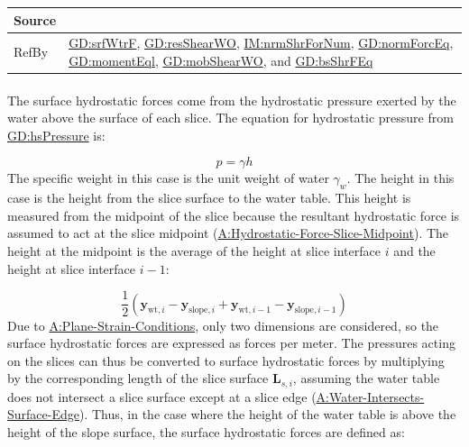 \documentclass[12pt]{article}
\begin{document}
\begin{minipage}{\textwidth}
\begin{tabular}{>{\raggedright}p{}>{\raggedright\arraybackslash}p{}}
\\ \midrule
Source & \cite{fredlund1977}
         
\\ \midrule
RefBy & \hyperref[GD:srfWtrF]{GD:srfWtrF}, \hyperref[GD:resShearWO]{GD:resShearWO}, \hyperref[IM:nrmShrForNum]{IM:nrmShrForNum}, \hyperref[GD:normForcEq]{GD:normForcEq}, \hyperref[GD:momentEql]{GD:momentEql}, \hyperref[GD:mobShearWO]{GD:mobShearWO}, and \hyperref[GD:bsShrFEq]{GD:bsShrFEq}
        
\\ \bottomrule
\end{tabular}
\end{minipage}

\paragraph{}
\label{GD:srfWtrFDeriv}
The surface hydrostatic forces come from the hydrostatic pressure exerted by the water above the surface of each slice. The equation for hydrostatic pressure from \hyperref[GD:hsPressure]{GD:hsPressure} is:

\begin{displaymath}
p=γ h
\end{displaymath}
The specific weight in this case is the unit weight of water ${γ_{w}}$. The height in this case is the height from the slice surface to the water table. This height is measured from the midpoint of the slice because the resultant hydrostatic force is assumed to act at the slice midpoint (\hyperref[assumpHFSM]{A:Hydrostatic-Force-Slice-Midpoint}). The height at the midpoint is the average of the height at slice interface $i$ and the height at slice interface $i-1$:

\begin{displaymath}
\frac{1}{2} \left({\symbf{y}_{\text{wt},i}}-{\symbf{y}_{\text{slope},i}}+{\symbf{y}_{\text{wt},i-1}}-{\symbf{y}_{\text{slope},i-1}}\right)
\end{displaymath}
Due to \hyperref[assumpPSC]{A:Plane-Strain-Conditions}, only two dimensions are considered, so the surface hydrostatic forces are expressed as forces per meter. The pressures acting on the slices can thus be converted to surface hydrostatic forces by multiplying by the corresponding length of the slice surface ${\symbf{L}_{s,i}}$, assuming the water table does not intersect a slice surface except at a slice edge (\hyperref[assumpWISE]{A:Water-Intersects-Surface-Edge}). Thus, in the case where the height of the water table is above the height of the slope surface, the surface hydrostatic forces are defined as:
\end{document}
